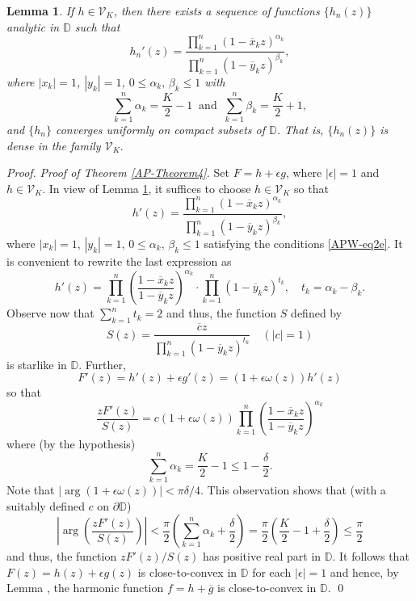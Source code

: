 \documentclass[a4paper,12pt]{amsart}
\newtheorem{lem}{Lemma}
\theoremstyle{definition}
\newenvironment{pf}[1][]{ \vskip 3mm
 \noindent
 \ifthenelse{\equal{#1}{}}  {{\slshape Proof. }}  {{\slshape #1.} } }{\qed\bigskip}
\newcounter{tmp}
\begin{document}
\begin{lem}\label{lem1a}
If $h\in{\mathcal V}_K$, then there exists a sequence of functions $\{h_n(z)\}$ analytic in ${{\mathbb D}}$
such that
\begin{equation}\label{APW-eq2}
h_{n}'(z)=\frac{\prod\limits_{k=1}^{n}(1-\overline{x}_{k}z)^{ \alpha _{k}}}{\prod\limits_{k=1}^{n}(1-\overline{y}_{k}z)^{ \beta _{k}} },
\end{equation}
where $|x_{k}|=1$, $|y_{k}|=1$, $0\leq \alpha _{k},\,\beta _{k} \leq 1$ with
\begin{equation}\label{APW-eq2e}
\sum\limits_{k=1}^{n}\alpha _{k}=\frac{K}{2}-1 ~\mbox{ and }~\sum\limits_{k=1}^{n}\beta _{k}=\frac{K}{2}+1,
\end{equation}
and $\{h_n\}$ converges uniformly on compact subsets of ${{\mathbb D}}$. That is, $\{h_n(z)\}$ is dense in the family
${\mathcal V}_K.$
\end{lem}

\begin{pf}[Proof of Theorem \ref{AP-Theorem4}]
Set $F=h+\epsilon g$, where $|\epsilon|=1$ and $h\in{\mathcal V}_K$. In view of Lemma \ref{lem1a}, it suffices to choose $h\in {\mathcal V}_{K}$ so that
$$h'(z)=\frac{\prod\limits_{k=1}^{n}(1-\overline{x}_{k}z)^{ \alpha _{k}}}{\prod\limits_{k=1}^{n}(1-\overline{y}_{k}z)^{ \beta _{k}} },
$$
where $|x_{k}|=1$, $|y_{k}|=1$, $0\leq \alpha _{k},\,\beta _{k} \leq 1$ satisfying the conditions \eqref{APW-eq2e}. It is convenient to rewrite the
last expression as
$$h'(z)= \prod\limits_{k=1}^{n} \left (\frac{1-\overline{x}_kz}{1-\overline{y}_kz}\right )^{ \alpha _k} \cdot
\prod\limits_{k=1}^{n}(1-\overline{y}_{k}z)^{ t_k}, \quad t_k=\alpha _{k}- \beta _{k}.
$$
Observe now that $\sum\limits_{k=1}^{n}t_k=2$ and thus, the function $S$ defined by
$$S(z)=\frac{\overline{c}z}{\prod \limits_{k=1}^{n}(1-\overline{y}_{k}z)^{t _k}} \quad (|c|=1)
$$
is starlike in ${{\mathbb D}}$. Further,
$$ F'(z)=h'(z)+\epsilon g'(z)=(1+\epsilon \omega (z))h'(z)
$$
so that
$$\frac{zF'(z)}{S(z)}=c(1+\epsilon \omega (z))\prod\limits_{k=1}^{n} \left (\frac{1-\overline{x}_kz}{1-\overline{y}_kz}\right )^{ \alpha _k}
$$
where (by the hypothesis)
$$\sum\limits_{k=1}^{n} \alpha _{k}=\frac{K}{2}-1\leq 1-\frac{\delta }{2}.
$$
Note that $ |\arg (1+\epsilon\omega (z))|<\pi\delta /4$.
This observation shows that (with a suitably defined $c$ on $\partial {{\mathbb D}}$)
$$ \left |\arg \left (\frac{zF'(z)}{S(z)}\right )\right |
< \frac{\pi}{2} \left (\sum\limits_{k=1}^{n} \alpha _{k}+ \frac{\delta }{2}\right )=
\frac{\pi}{2} \left ( \frac{K}{2}-1+ \frac{\delta }{2}\right ) \leq \frac{\pi}{2}
$$
and thus, the function $zF'(z)/S(z)$ has positive real part in ${{\mathbb D}}$. It follows that
$F(z)=h(z)+\epsilon g(z)$ is close-to-convex in ${{\mathbb D}}$
for each $|\epsilon |=1$ and hence, by Lemma {}, the
harmonic function $ f=h+\overline{g}$ is close-to-convex in ${{\mathbb D}}$.
\end{pf}
\end{document}
